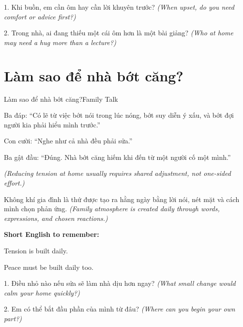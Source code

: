 \begin{tuhocnhanh}
1. Khi buồn, em cần ôm hay cần lời khuyên trước? \textit{(When upset, do you need comfort or advice first?)}

2. Trong nhà, ai đang thiếu một cái ôm hơn là một bài giảng? \textit{(Who at home may need a hug more than a lecture?)}
\end{tuhocnhanh}
\ngancach

\section{Làm sao để nhà bớt căng?}
\begin{truyen}{Làm sao để nhà bớt căng?}{Family Talk}

Ba đáp: ``Có lẽ từ việc bớt nói trong lúc nóng, bớt suy diễn ý xấu, và bớt đợi người kia phải hiểu mình trước.''

Con cười: ``Nghe như cả nhà đều phải sửa.''

Ba gật đầu: ``Đúng. Nhà bớt căng hiếm khi đến từ một người cố một mình.''

\textit{(Reducing tension at home usually requires shared adjustment, not one-sided effort.)}
\end{truyen}

\begin{baihoc}
Không khí gia đình là thứ được tạo ra hằng ngày bằng lời nói, nét mặt và cách mình chọn phản ứng.
\textit{(Family atmosphere is created daily through words, expressions, and chosen reactions.)}
\end{baihoc}

\begin{ghinhoanh}
\textbf{Short English to remember:}

Tension is built daily.

Peace must be built daily too.
\end{ghinhoanh}

\begin{tuhocnhanh}
1. Điều nhỏ nào nếu sửa sẽ làm nhà dịu hơn ngay? \textit{(What small change would calm your home quickly?)}

2. Em có thể bắt đầu phần của mình từ đâu? \textit{(Where can you begin your own part?)}
\end{tuhocnhanh}
\ngancach